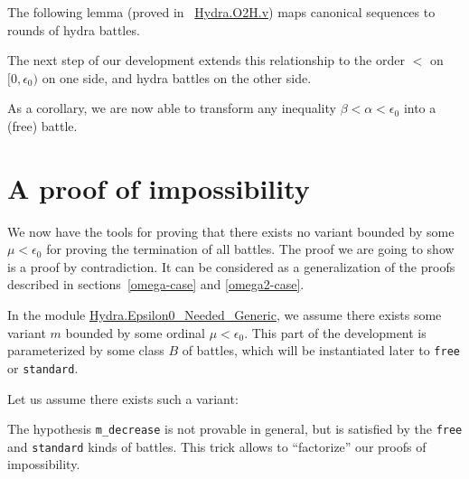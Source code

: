 The following lemma (proved in ~\href{../theories/html/hydras.Hydra.O2H.html}{Hydra.O2H.v}) maps  canonical sequences to rounds of hydra battles.


\label{lemma:canonS-iota}



The next step of our development extends this relationship to
the order $<$ on $[0,\epsilon_0)$ on one side, and hydra battles on the other side.



As a corollary, we are now able to transform any inequality $\beta<\alpha<\epsilon_0$ into a (free) battle.




\section{A  proof of impossibility}

We now have  the tools for proving that  there exists no variant bounded by some $\mu<\epsilon_0$ for proving the termination   of all battles. The proof we are going to show is a proof by contradiction. It  can
 be considered as a generalization of the
proofs described in  sections~\vref{omega-case} and \vref{omega2-case}.



In the module
\href{../theories/html/hydras.Hydra.Epsilon0_Needed_Generic.html}{Hydra.Epsilon0\_Needed\_Generic}, we assume there exists some variant $m$ bounded by some ordinal $\mu<\epsilon_0$. This part of the development is parameterized by some class $B$ of battles, which will be instantiated later to \texttt{free} or \texttt{standard}.





Let us assume there exists such a variant:



\label{remark:m-decrease}
\begin{remark}
  The hypothesis \texttt{m\_decrease} is not provable  in general, but is satisfied by
the  \texttt{free} and \texttt{standard} kinds of battles. This trick allows to 
``factorize'' our proofs  of impossibility.
\end{remark}



